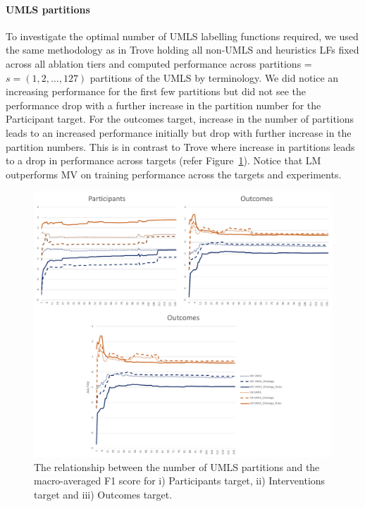 \documentclass[10.7pt,]{article}
\let\oldparagraph\paragraph
\renewcommand{\paragraph}[1]{\oldparagraph{#1}\mbox{}}
\begin{document}
\paragraph{UMLS partitions}
To investigate the optimal number of UMLS labelling functions required, we used the same methodology as in Trove holding all non-UMLS and heuristics LFs fixed across all ablation tiers and computed performance across partitions = $s = ( 1, 2, \dotso , 127 )$ partitions of the UMLS by terminology.
We did notice an increasing performance for the first few partitions but did not see the performance drop with a further increase in the partition number for the Participant target.
For the outcomes target, increase in the number of partitions leads to an increased performance initially but drop with further increase in the partition numbers.
This is in contrast to Trove where increase in partitions leads to a drop in performance across targets (refer Figure~\ref{fig:partitions}).
Notice that LM outperforms MV on training performance across the targets and experiments.
%
\begin{figure} %
    \centering
    \includegraphics{figures/partitions.pdf}
    \caption{The relationship between the number of UMLS partitions and the macro-averaged F1 score for i) Participants target, ii) Interventions target and iii) Outcomes target.}
    \label{fig:partitions}
\end{figure}
%
%
%
\end{document}
